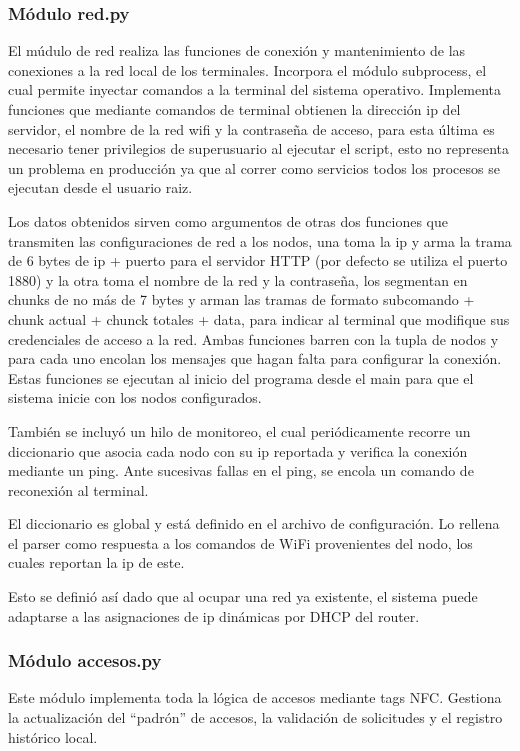 \subsubsection{Módulo red.py}
El múdulo de red realiza las funciones de conexión y mantenimiento de las conexiones a la red local de los terminales.
Incorpora el módulo subprocess, el cual permite inyectar comandos a la terminal del sistema operativo. Implementa funciones que mediante comandos de terminal obtienen la dirección ip del servidor, el nombre de la red wifi y la contraseña de acceso, para esta última es necesario tener privilegios de superusuario al ejecutar el script, esto no representa un problema en producción ya que al correr como servicios todos los procesos se ejecutan desde el usuario raiz.

Los datos obtenidos sirven como argumentos de otras dos funciones que transmiten las configuraciones de red a los nodos, una toma la ip y arma la trama de 6 bytes de ip + puerto para el servidor HTTP (por defecto se utiliza el puerto 1880) y la otra toma el nombre de la red y la contraseña, los segmentan en chunks de no más de 7 bytes y arman las tramas de formato subcomando + chunk actual + chunck totales + data, para indicar al terminal que modifique sus credenciales de acceso a la red.
Ambas funciones barren con la tupla de nodos y para cada uno encolan los mensajes que hagan falta para configurar la conexión.
Estas funciones se ejecutan al inicio del programa desde el main para que el sistema inicie con los nodos configurados.

También se incluyó un hilo de monitoreo, el cual periódicamente recorre un diccionario que asocia cada nodo con su ip reportada y verifica la conexión mediante un ping. Ante sucesivas fallas en el ping, se encola un comando de reconexión al terminal.

El diccionario es global y está definido en el archivo de configuración. Lo rellena el parser como respuesta a los comandos de WiFi provenientes del nodo, los cuales reportan la ip de este.

Esto se definió así dado que al ocupar una red ya existente, el sistema puede adaptarse a las asignaciones de ip dinámicas por DHCP del router.

\subsubsection{Módulo accesos.py}
Este módulo implementa toda la lógica de accesos mediante tags NFC. Gestiona la actualización del \enquote{padrón} de accesos, la validación de solicitudes y el registro histórico local.

